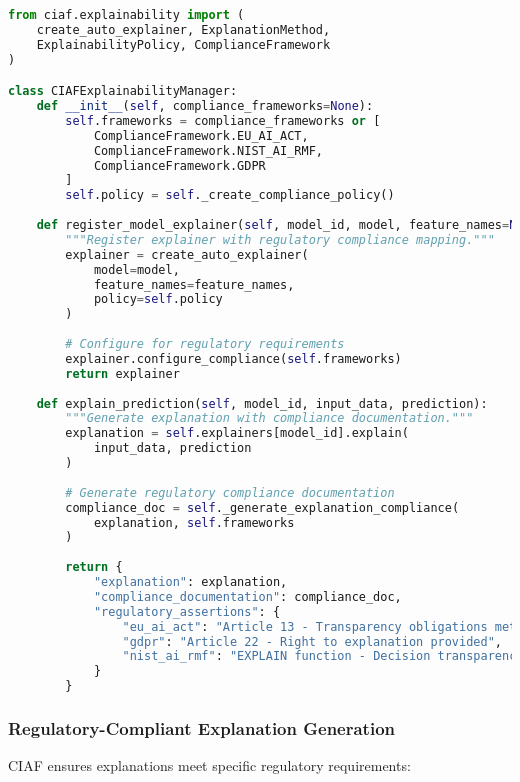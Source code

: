 \documentclass[12pt,a4paper]{article}
\begin{document}
\begin{lstlisting}[language=Python, caption=CIAF Explainability Framework]
from ciaf.explainability import (
    create_auto_explainer, ExplanationMethod, 
    ExplainabilityPolicy, ComplianceFramework
)

class CIAFExplainabilityManager:
    def __init__(self, compliance_frameworks=None):
        self.frameworks = compliance_frameworks or [
            ComplianceFramework.EU_AI_ACT,
            ComplianceFramework.NIST_AI_RMF,
            ComplianceFramework.GDPR
        ]
        self.policy = self._create_compliance_policy()
    
    def register_model_explainer(self, model_id, model, feature_names=None):
        """Register explainer with regulatory compliance mapping."""
        explainer = create_auto_explainer(
            model=model,
            feature_names=feature_names,
            policy=self.policy
        )
        
        # Configure for regulatory requirements
        explainer.configure_compliance(self.frameworks)
        return explainer
    
    def explain_prediction(self, model_id, input_data, prediction):
        """Generate explanation with compliance documentation."""
        explanation = self.explainers[model_id].explain(
            input_data, prediction
        )
        
        # Generate regulatory compliance documentation
        compliance_doc = self._generate_explanation_compliance(
            explanation, self.frameworks
        )
        
        return {
            "explanation": explanation,
            "compliance_documentation": compliance_doc,
            "regulatory_assertions": {
                "eu_ai_act": "Article 13 - Transparency obligations met",
                "gdpr": "Article 22 - Right to explanation provided",
                "nist_ai_rmf": "EXPLAIN function - Decision transparency"
            }
        }
\end{lstlisting}

\subsubsection{Regulatory-Compliant Explanation Generation}

CIAF ensures explanations meet specific regulatory requirements:
\end{document}

